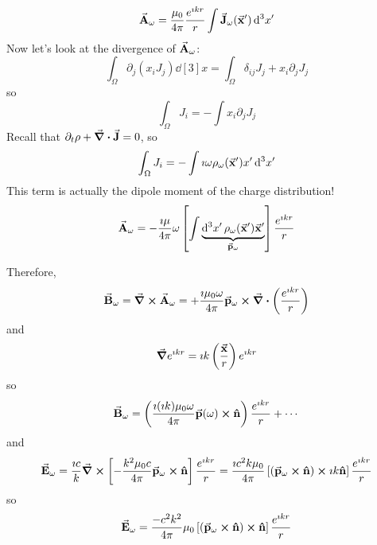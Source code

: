 \documentclass[a4paper,twoside,master.tex]{subfiles}
\begin{document}
\begin{equation}
    \va{A}_{\omega} = \frac{\mu_0}{4 \pi} \frac{e^{\imath k r}}{r} \int \va{J}_{\omega}( \va{x}') \dd[3]{x'}
\end{equation}
Now let's look at the divergence of $ \va{A}_{\omega} $:
\begin{equation}
    \int_{\Omega} \partial_j (x_i J_j) \dd[3]{x} = \int_{\Omega} \delta_{ij} J_j + x_i \partial_j J_j
\end{equation}
so
\begin{equation}
    \int_{\Omega} J_i = - \int x_i \partial_j J_j
\end{equation}
Recall that $ \partial_t \rho + \div{ \va{J}} = 0 $, so
\begin{equation}
    \int_{\Omega} J_i = - \int \imath \omega \rho_{\omega}( \va{x}') x' \dd[3]{x'}
\end{equation}
This term is actually the dipole moment of the charge distribution!
\begin{equation}
    \va{A}_{\omega} = - \frac{\imath \mu}{4 \pi} \omega \left[ \int \underbrace{\dd[3]{x'} \rho_{\omega}( \va{x}') \va{x}'}_{ \va{p}_{\omega}} \right] \frac{e^{\imath kr}}{r}
\end{equation}

Therefore,
\begin{equation}
    \va{B}_{\omega} = \curl{ \va{A}_{\omega}} = + \frac{\imath \mu_0 \omega}{4 \pi} \va{p}_{\omega} \cross \div{\left( \frac{e^{\imath kr}}{r} \right)}
\end{equation}
and
\begin{equation}
    \grad{e^{\imath kr}} = \imath k \left( \frac{ \va{x}}{r} \right) e^{\imath kr} 
\end{equation}
so
\begin{equation}
    \va{B}_{\omega} = \left( \frac{\imath (\imath k) \mu_0 \omega}{4 \pi} \va{p}(\omega) \cross \vu{n} \right) \frac{e^{\imath kr}}{r} + \cdots
\end{equation}
and
\begin{equation}
    \va{E}_{\omega} = \frac{\imath c}{k} \curl{\left[ - \frac{k^2 \mu_0 c}{4 \pi} \va{p}_{\omega} \cross \vu{n}  \right] \frac{e^{\imath kr}}{r}} = \frac{\imath c^2 k \mu_0}{4 \pi} \left[ ( \va{p}_{\omega} \cross \vu{n}) \cross \imath k \vu{n} \right] \frac{e^{\imath kr}}{r}
\end{equation}
so
\begin{equation}
    \va{E}_{\omega} = \frac{- c^2 k^2}{4 \pi} \mu_0 \left[ ( \va{p}_{\omega} \cross \vu{n}) \cross \vu{n} \right] \frac{e^{\imath kr}}{r}
\end{equation}
\end{document}

